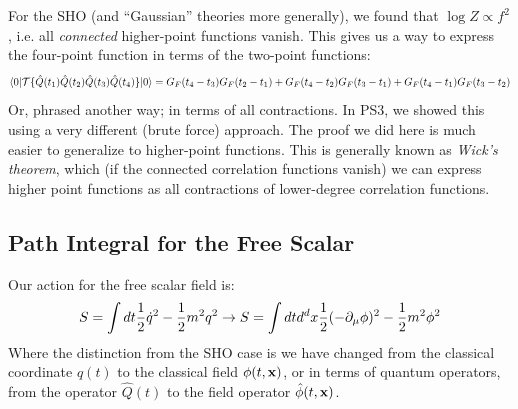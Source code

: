For the SHO (and ``Gaussian'' theories more generally), we found that $\log Z \propto f^2$, i.e. all \emph{connected} higher-point functions vanish. This gives us a way to express the four-point function in terms of the two-point functions:
\begin{equation}
    \langle 0 \rvert\mathcal{T}\{\hat{Q}(t_1)\hat{Q}(t_2)\hat{Q}(t_3)\hat{Q}(t_4)\}\lvert 0 \rangle = G_F(t_4-t_3)G_F(t_2-t_1) + G_F(t_4-t_2)G_F(t_3-t_1) + G_F(t_4-t_1)G_F(t_3-t_2)
\end{equation}
Or, phrased another way; in terms of all contractions. In PS3, we showed this using a very different (brute force) approach. The proof we did here is much easier to generalize to higher-point functions. This is generally known as \emph{Wick's theorem}, which (if the connected correlation functions vanish) we can express higher point functions as all contractions of lower-degree correlation functions.

\subsection{Path Integral for the Free Scalar}
Our action for the free scalar field is:
\begin{equation}
    S = \int dt \frac{1}{2}\dot{q}^2 - \frac{1}{2}m^2q^2 \to S = \int dt d^dx \frac{1}{2}(-\partial_\mu \phi)^2 - \frac{1}{2}m^2\phi^2
\end{equation}
Where the distinction from the SHO case is we have changed from the classical coordinate $q(t)$ to the classical field $\phi(t, \mathbf{x})$, or in terms of quantum operators, from the operator $\hat{Q}(t)$ to the field operator $\hat{\phi}(t, \mathbf{x})$. 

